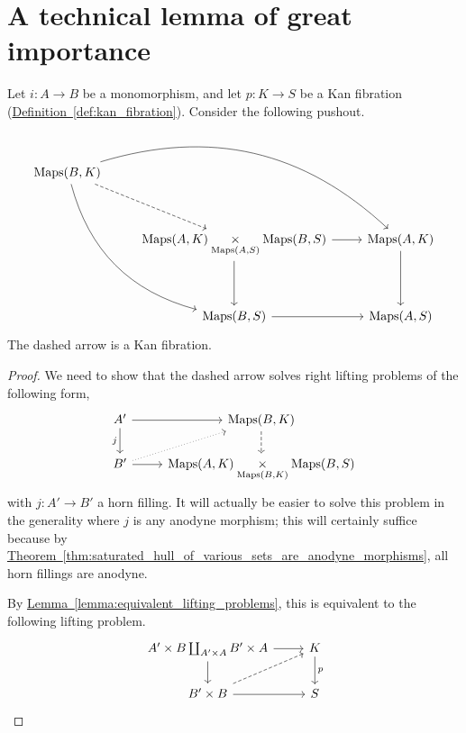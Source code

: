 \documentclass[main.tex]{subfiles}
\begin{document}
\section{A technical lemma of great importance}
\label{sec:a_technical_lemma_of_great_importance}

\begin{lemma}
  \label{lemma:kan_fibrations_preserved_under_dual_to_smash_product}
  Let $i\colon A \to B$ be a monomorphism, and let $p\colon K \to S$ be a Kan fibration (\hyperref[def:kan_fibration]{Definition~\ref*{def:kan_fibration}}). Consider the following pushout.
  \begin{equation*}
    \begin{tikzcd}[row sep=huge]
      \Maps(B, K)
      \arrow[rrd, bend left]
      \arrow[rdd, bend right]
      \arrow[rd, dashed]
      \\
      & \Maps(A, K) \underset{\Maps(A, S)}{\times} \Maps(B, S)
      \arrow[r]
      \arrow[d]
      & \Maps(A, K)
      \arrow[d]
      \\
      & \Maps(B, S)
      \arrow[r]
      & \Maps(A, S)
    \end{tikzcd}
  \end{equation*}
  The dashed arrow is a Kan fibration.
\end{lemma}
\begin{proof}
  We need to show that the dashed arrow solves right lifting problems of the following form,
  \begin{equation*}
    \begin{tikzcd}
      A'
      \arrow[d, swap, "j"]
      \arrow[r]
      & \Maps(B, K)
      \arrow[d, dashed]
      \\
      B'
      \arrow[r,]
      \arrow[ur, dotted]
      & \Maps(A, K) \underset{\Maps(B, K)}{\times} \Maps(B, S)
    \end{tikzcd}
  \end{equation*}
  with $j\colon A' \to B'$ a horn filling. It will actually be easier to solve this problem in the generality where $j$ is any anodyne morphism; this will certainly suffice because by \hyperref[thm:saturated_hull_of_various_sets_are_anodyne_morphisms]{Theorem~\ref*{thm:saturated_hull_of_various_sets_are_anodyne_morphisms}}, all horn fillings are anodyne.

  By \hyperref[lemma:equivalent_lifting_problems]{Lemma~\ref*{lemma:equivalent_lifting_problems}}, this is equivalent to the following lifting problem.
  \begin{equation*}
    \begin{tikzcd}
      A' \times B \coprod_{A' \times A} B' \times A
      \arrow[r]
      \arrow[d]
      & K
      \arrow[d, "p"]
      \\
      B' \times B
      \arrow[r]
      \arrow[ur, dashed]
      & S
    \end{tikzcd}
  \end{equation*}
\end{proof}
\end{document}
